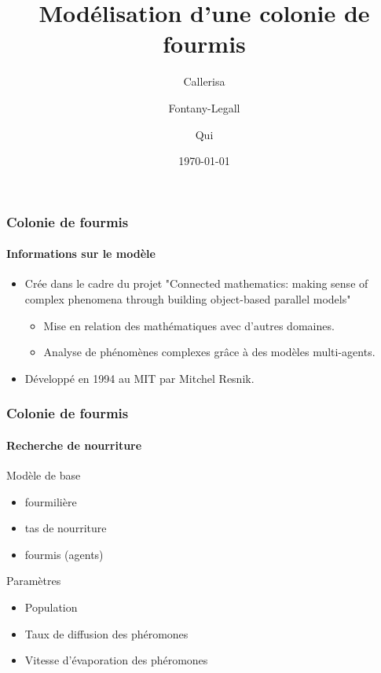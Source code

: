 \documentclass[11pt]{beamer}
\author{Callerisa \and Fontany-Legall \and Qui}
\title{Modélisation d'une colonie de fourmis}
\institute{Université de Nice}
\date{\today}
\begin{document}
\begin{frame}

\titlepage
\end{frame}

\begin{frame}
\frametitle{Colonie de fourmis}
\framesubtitle {Informations sur le modèle}
\begin{itemize}
\item Crée dans le cadre du projet "Connected mathematics: making sense of complex phenomena through building object-based parallel models"
\begin{itemize} 
\item Mise en relation des mathématiques avec d'autres domaines.
\item Analyse de phénomènes complexes grâce à des modèles multi-agents.
\end{itemize}
\item Développé en 1994 au MIT par Mitchel Resnik.
\end{itemize}
\end{frame}

\begin{frame}
\frametitle{Colonie de fourmis}
\framesubtitle{Recherche de nourriture}
\begin{block}{Modèle de base}
\begin{itemize}
\item fourmilière
\item tas de nourriture
\item fourmis (agents)
\end{itemize}
\end{block}
\begin{block}{Paramètres}
\begin{itemize}
\item Population
\item Taux de diffusion des phéromones
\item Vitesse d'évaporation des phéromones
\end{itemize}
\end{block}
\end{frame}
\end{document}
